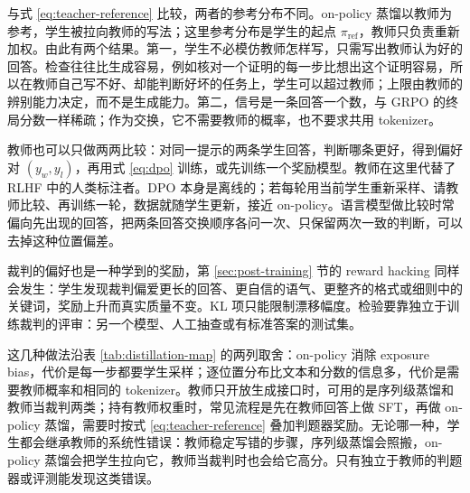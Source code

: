 与式 \eqref{eq:teacher-reference} 比较，两者的参考分布不同。on-policy 蒸馏以教师为参考，学生被拉向教师的写法；这里参考分布是学生的起点 \(\pi_{\mathrm{ref}}\)，教师只负责重新加权。由此有两个结果。第一，学生不必模仿教师怎样写，只需写出教师认为好的回答。检查往往比生成容易，例如核对一个证明的每一步比想出这个证明容易，所以在教师自己写不好、却能判断好坏的任务上，学生可以超过教师；上限由教师的辨别能力决定，而不是生成能力。第二，信号是一条回答一个数，与 GRPO 的终局分数一样稀疏；作为交换，它不需要教师的概率，也不要求共用 tokenizer。

教师也可以只做两两比较：对同一提示的两条学生回答，判断哪条更好，得到偏好对 \((y_w,y_l)\)，再用式 \eqref{eq:dpo} 训练，或先训练一个奖励模型。教师在这里代替了 RLHF 中的人类标注者。DPO 本身是离线的；若每轮用当前学生重新采样、请教师比较、再训练一轮，数据就随学生更新，接近 on-policy。语言模型做比较时常偏向先出现的回答，把两条回答交换顺序各问一次、只保留两次一致的判断，可以去掉这种位置偏差。

裁判的偏好也是一种学到的奖励，第 \ref{sec:post-training} 节的 reward hacking 同样会发生：学生发现裁判偏爱更长的回答、更自信的语气、更整齐的格式或细则中的关键词，奖励上升而真实质量不变。KL 项只能限制漂移幅度。检验要靠独立于训练裁判的评审：另一个模型、人工抽查或有标准答案的测试集。

这几种做法沿表 \ref{tab:distillation-map} 的两列取舍：on-policy 消除 exposure bias，代价是每一步都要学生采样；逐位置分布比文本和分数的信息多，代价是需要教师概率和相同的 tokenizer。教师只开放生成接口时，可用的是序列级蒸馏和教师当裁判两类；持有教师权重时，常见流程是先在教师回答上做 SFT，再做 on-policy 蒸馏，需要时按式 \eqref{eq:teacher-reference} 叠加判题器奖励。无论哪一种，学生都会继承教师的系统性错误：教师稳定写错的步骤，序列级蒸馏会照搬，on-policy 蒸馏会把学生拉向它，教师当裁判时也会给它高分。只有独立于教师的判题器或评测能发现这类错误。
